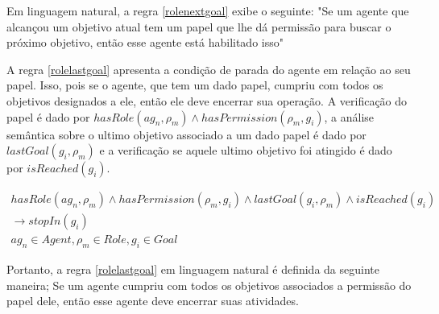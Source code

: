 Em linguagem natural, a regra \ref{rolenextgoal} exibe o seguinte: "Se um agente que alcançou um objetivo atual tem um papel que lhe dá permissão para 
buscar o próximo objetivo, então esse agente está habilitado isso"

A regra \ref{rolelastgoal} apresenta a condição de parada do agente em relação ao seu papel. Isso, pois se o agente, que tem um dado papel,
cumpriu com todos os objetivos designados a ele, então ele deve encerrar sua operação. A verificação do papel é dado por $hasRole(ag_n,\rho_m) \wedge
 hasPermission(\rho_m,g_i)$, a análise semântica sobre o ultimo objetivo associado a um dado papel é dado por $lastGoal(g_i,\rho_m)$ e a verificação 
 se aquele ultimo objetivo foi atingido é dado por $isReached(g_i)$. 

\begin{eqnarray}\label{rolelastgoal}
	hasRole(ag_n,\rho_m) \wedge hasPermission(\rho_m,g_i) \wedge lastGoal(g_i,\rho_m) \wedge isReached(g_i) \nonumber \\
	\to stopIn(g_i) \nonumber \\
    ag_n \in Agent, \rho_m \in Role, g_i \in Goal
\end{eqnarray}

Portanto, a regra \ref{rolelastgoal} em linguagem natural é definida da seguinte maneira; Se um agente cumpriu com todos os objetivos associados a 
permissão do papel dele, então esse agente deve encerrar suas atividades. 